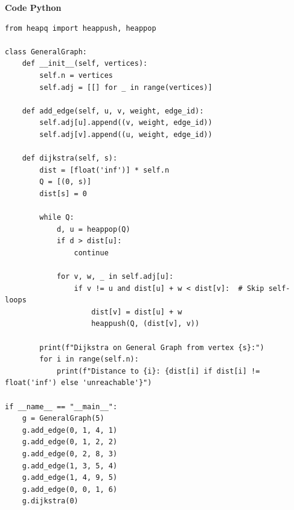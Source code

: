 \documentclass[a4paper,12pt]{article}
\begin{document}
\textbf{Code Python}
\lstset{language=Python}
\begin{lstlisting}
from heapq import heappush, heappop

class GeneralGraph:
    def __init__(self, vertices):
        self.n = vertices
        self.adj = [[] for _ in range(vertices)]

    def add_edge(self, u, v, weight, edge_id):
        self.adj[u].append((v, weight, edge_id))
        self.adj[v].append((u, weight, edge_id))

    def dijkstra(self, s):
        dist = [float('inf')] * self.n
        Q = [(0, s)]
        dist[s] = 0

        while Q:
            d, u = heappop(Q)
            if d > dist[u]:
                continue

            for v, w, _ in self.adj[u]:
                if v != u and dist[u] + w < dist[v]:  # Skip self-loops
                    dist[v] = dist[u] + w
                    heappush(Q, (dist[v], v))

        print(f"Dijkstra on General Graph from vertex {s}:")
        for i in range(self.n):
            print(f"Distance to {i}: {dist[i] if dist[i] != float('inf') else 'unreachable'}")

if __name__ == "__main__":
    g = GeneralGraph(5)
    g.add_edge(0, 1, 4, 1)
    g.add_edge(0, 1, 2, 2)
    g.add_edge(0, 2, 8, 3)
    g.add_edge(1, 3, 5, 4)
    g.add_edge(1, 4, 9, 5)
    g.add_edge(0, 0, 1, 6)
    g.dijkstra(0)
\end{lstlisting}
\end{document}
